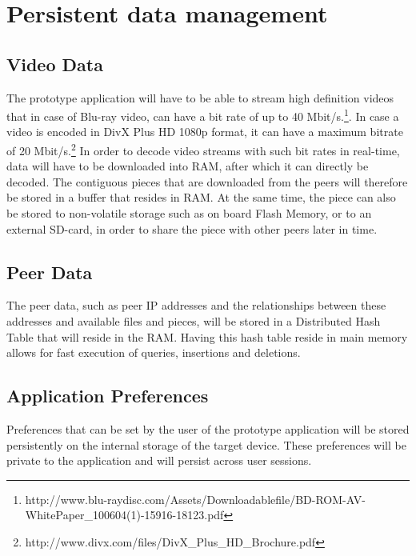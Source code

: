\section{Persistent data management}
\label{sec:perdata}
\subsection{Video Data}
The prototype application will have to be able to stream high definition videos that in case of Blu-ray video, can have a bit rate of up to 40 Mbit/s.\footnote{http://www.blu-raydisc.com/Assets/Downloadablefile/BD-ROM-AV-WhitePaper\_100604(1)-15916-18123.pdf}. In case a video is encoded in DivX Plus HD 1080p format, it can have a maximum bitrate of 20 Mbit/s.\footnote{http://www.divx.com/files/DivX\_Plus\_HD\_Brochure.pdf} In order to decode video streams with such bit rates in real-time, data will have to be downloaded into RAM, after which it can directly be decoded. The contiguous pieces that are downloaded from the peers will therefore be stored in a buffer that resides in RAM. At the same time, the piece can also be stored to non-volatile storage such as on board Flash Memory, or to an external SD-card, in order to share the piece with other peers later in time.
\subsection{Peer Data}
The peer data, such as peer IP addresses and the relationships between these addresses and available files and pieces, will be stored in a Distributed Hash Table that will reside in the RAM. Having this hash table reside in main memory allows for fast execution of queries, insertions and deletions.
\subsection{Application Preferences}
Preferences that can be set by the user of the prototype application will be stored persistently on the internal storage of the target device. These preferences will be private to the application and will persist across user sessions.



